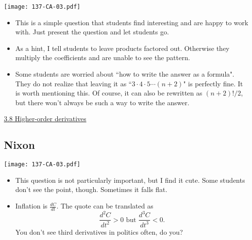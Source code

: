 \documentclass[11pt]{article}
\newcommand {\DS} [1] {${\displaystyle #1}$}
\newcommand{\nl}{\hfill \vspace{-1.1\baselineskip}} %
\newcommand{\vviii}{\hspace{8mm} \href{https://www.youtube.com/watch?v=7su5mypmgdw&list=PLlwePzQY_wW8qiZD6XYqCnibdY37ygbx7&index=8}{3.8 Higher-order derivatives}}
\begin{document}
\begin{center}
{ \texttt{[image: 137-CA-03.pdf]}} 
\end{center}


\begin{comments}
\nl
	\begin{itemize}
		\item  This is a simple question that students find interesting and are happy to work with.  Just present the question and let students go.
		\item As a hint, I tell students to leave products factored out.  Otherwise they multiply the coefficients and are unable to see the pattern.
		\item Some students are worried about ``how to write the answer as a formula".  They do not realize that leaving it as ``\DS{3 \cdot 4 \cdot 5 \cdots (n+2)}" is perfectly fine.  It is worth mentioning this.  Of course, it can also be rewritten as \DS{(n+2)!/2}, but there won't always be such a way to write the answer.
	\end{itemize}
	
\end{comments}

\begin{videos}
\vviii
\end{videos}

\newpage


\subsection{Nixon} 

\begin{center}
{ \texttt{[image: 137-CA-03.pdf]}} 
\end{center}


\begin{comments}
\nl
	\begin{itemize}
		\item  This question is not particularly important, but I find it cute.  Some students don't see the point, though.  Sometimes it falls flat.
		\item  Inflation is \DS{\frac{dC}{dt}}.  The quote can be translated as 
			$$\frac{d^2C}{dt^2} > 0 \mbox{ but } \frac{d^3C}{dt^3} < 0.$$  
			You don't see third derivatives in politics often, do you?
	\end{itemize}
\end{comments}
\end{document}

